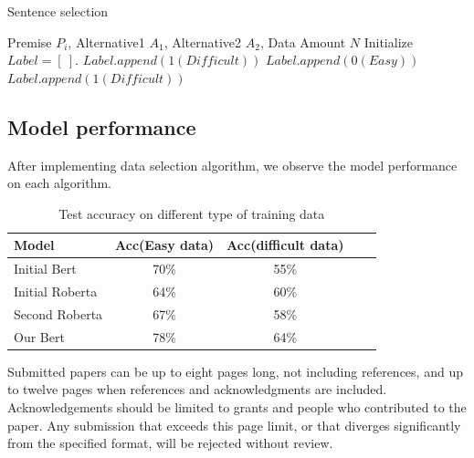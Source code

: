 \documentclass{article}
\begin{document}
\begin{algorithm}[tb]
   \caption{Sentence selection}
   \label{alg:example}
\begin{algorithmic}
    Premise $P_i$, Alternative1 $A_1$, Alternative2 $A_2$, Data Amount $N$
   \REPEAT
   \STATE Initialize $Label = [\ ]$.
  		\STATE $Label.append(1(Difficult))$
   		\STATE $Label.append(0(Easy))$
   		\STATE $Label.append(1(Difficult))$
   \ENDIF
   \ENDFOR
   \UNTIL
\end{algorithmic}
\end{algorithm}

\subsection{Model performance}
After implementing data selection algorithm, we observe the model performance on each algorithm. 
\begin{table}[t]
\caption{Test accuracy on different type of training data}
\label{sample-table}
\vskip 0.15in
\begin{center}
\begin{small}
\begin{sc}
\begin{tabular}{lcccr}
\toprule
Model & Acc(Easy data) & Acc(difficult data)  \\
\midrule
Initial Bert    & 70\% & 55\% \\
Initial Roberta    & 64\% & 60\% \\
Second Roberta    & 67\% & 58\% \\
Our Bert        & 78\% & 64\% \\

\bottomrule
\end{tabular}
\end{sc}
\end{small}
\end{center}
\vskip -0.1in
\end{table}

Submitted papers can be up to eight pages long, not including references, and up to twelve pages when references and acknowledgments are included.
Acknowledgements should be limited to grants and people who contributed to the paper.
Any submission that exceeds
this page limit, or that diverges significantly from the specified format,
will be rejected without review.
\end{document}
